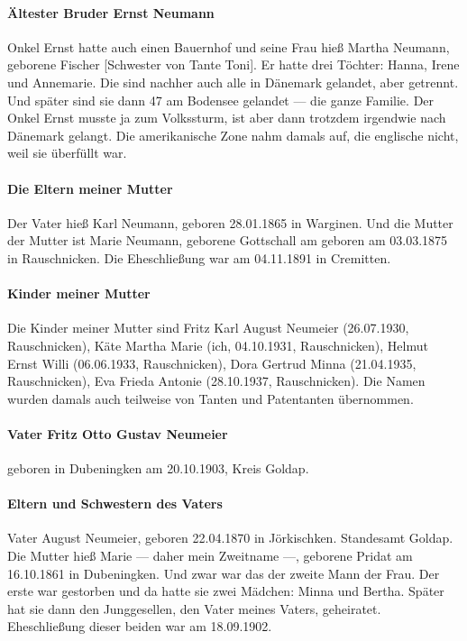 \documentclass[12pt, twoside]{book}
\begin{document}
\paragraph{Ältester Bruder Ernst Neumann} Onkel Ernst hatte auch einen Bauernhof und seine Frau hieß Martha Neumann, geborene Fischer [Schwester von Tante Toni]. Er hatte drei Töchter: Hanna, Irene und Annemarie.
Die sind nachher auch alle in Dänemark gelandet, aber getrennt. Und später sind sie dann 47 am Bodensee gelandet --- die ganze Familie. Der Onkel Ernst musste ja zum Volkssturm, ist aber dann trotzdem irgendwie nach Dänemark gelangt.
Die amerikanische Zone nahm damals auf, die englische nicht, weil sie überfüllt war.

\paragraph{Die Eltern meiner Mutter} Der Vater hieß Karl Neumann, geboren 28.01.1865 in Warginen. Und die Mutter der Mutter ist Marie Neumann, geborene Gottschall am geboren am 03.03.1875 in Rauschnicken.
Die Eheschließung war am 04.11.1891 in Cremitten.

\paragraph{Kinder meiner Mutter} Die Kinder meiner Mutter sind Fritz Karl August Neumeier (26.07.1930, Rauschnicken), Käte Martha Marie (ich, 04.10.1931, Rauschnicken), Helmut Ernst Willi (06.06.1933, Rauschnicken), Dora Gertrud Minna (21.04.1935, Rauschnicken), Eva Frieda Antonie (28.10.1937, Rauschnicken).
Die Namen wurden damals auch teilweise von Tanten und Patentanten übernommen.

\paragraph{Vater Fritz Otto Gustav Neumeier} geboren in Dubeningken am 20.10.1903, Kreis Goldap. 

\paragraph{Eltern und Schwestern des Vaters} Vater August Neumeier, geboren 22.04.1870 in Jörkischken. Standesamt Goldap.
Die Mutter hieß Marie --- daher mein Zweitname ---, geborene Pridat am 16.10.1861 in Dubeningken.
Und zwar war das der zweite Mann der Frau. Der erste war gestorben und da hatte sie zwei Mädchen: Minna und Bertha.
Später hat sie dann den Junggesellen, den Vater meines Vaters, geheiratet.
Eheschließung dieser beiden war am 18.09.1902.
\end{document}
